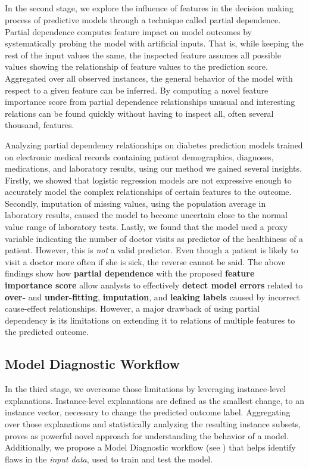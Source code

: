 \subsection{\emph{\prospector}}
In the second stage, we explore the influence of features in the decision making process of predictive models through a technique called partial dependence. Partial dependence computes feature impact on model outcomes by systematically probing the model with artificial inputs. That is, while keeping the rest of the input values the same, the inspected feature assumes all possible values showing the relationship of feature values to the prediction score. Aggregated over all observed instances, the general behavior of the model with respect to a given feature can be inferred. By computing a novel feature importance score from partial dependence relationships unusual and interesting relations can be found quickly without having to inspect all, often several thousand, features.

Analyzing partial dependency relationships on diabetes prediction models trained on electronic medical records containing patient demographics, diagnoses, medications, and laboratory results, using our method we gained several insights. Firstly, we showed that logistic regression models are not expressive enough to accurately model the complex relationships of certain features to the outcome. Secondly, imputation of missing values, using the population average in laboratory results, caused the model to become uncertain close to the normal value range of laboratory tests. Lastly, we found that the model used a proxy variable indicating the number of doctor visits as predictor of the healthiness of a patient.
However, this is \emph{not} a valid predictor.
Even though a patient is likely to visit a doctor more often if she is sick, the reverse cannot be said. The above findings show how \textbf{partial dependence} with the proposed \textbf{feature importance score} allow analysts to effectively \textbf{detect model errors} related to \textbf{over-} and \textbf{under-fitting}, \textbf{imputation}, and \textbf{leaking labels} caused by incorrect cause-effect relationships.
However, a major drawback of using partial dependency is its limitations on extending it to relations of multiple features to the predicted outcome.



\subsection{Model Diagnostic Workflow}
In the third stage, we overcome those limitations by leveraging instance-level explanations. Instance-level explanations are defined as the smallest change, to an instance vector, necessary to change the predicted outcome label. Aggregating over those explanations and statistically analyzing the resulting instance subsets, proves as powerful novel approach for understanding the behavior of a model. Additionally, we propose a Model Diagnostic workflow (see ) that helps identify flaws in the \emph{input data}, used to train and test the model.

